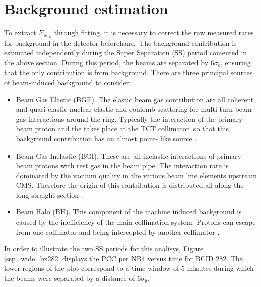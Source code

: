 \section{Background estimation}

To extract $\Sigma_{x,y}$ through fitting, it is necessary to correct the raw measured rates for background in the detector beforehand. The background contribution is estimated independently during the Super Separation (SS) period comented in the above section. During this period, the beams are separated by $6\sigma_{b}$, ensuring that the only contribution is from background. There are three principal sources of beam-induced background to consider:

\begin{itemize}

\item Beam Gas Elastic (BGE). The elastic beam gas contribution are all coherent and quasi-elastic nuclear elastic and coulomb scattering for multi-turn beam-gas interactions around the ring. Typically the interaction of the primary beam proton and the takes place at the TCT collimator, so that this background contribution has an almost point- like source \cite{bkg_source}.

\item Beam Gas Inelastic (BGI). These are all inelastic interactions of primary beam protons with rest gas in the beam pipe. The interaction rate is dominated by the vacuum quality in the various beam line elements upstream CMS. Therefore the origin of this contribution is distributed all along the long straight section \cite{bkg_source}.

\item Beam Halo (BH). This component of the machine induced background is caused by the inefficiency of the main collimation system. Protons can escape from one collimator and being intercepted by another collimator \cite{bkg_source}.
\end{itemize}

In order to illustrate the two SS periods for this analisys, Figure \ref{ssp_wide_bx282} displays the PCC per NB4 versus time for BCID 282. The lower regions of the plot correspond to a time window of 5 minutes during which the beams were separated by a distance of $6\sigma_{b}$.\\

